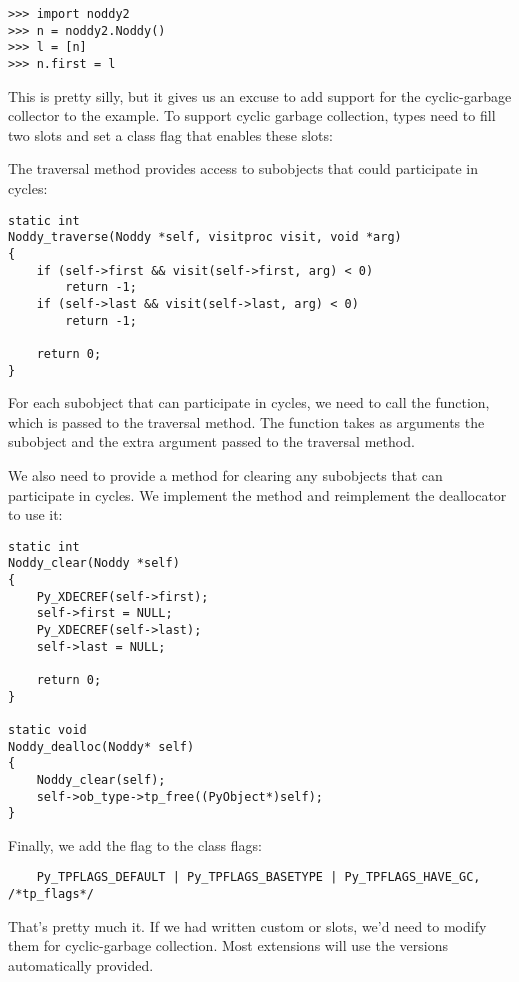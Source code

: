 \begin{verbatim}
>>> import noddy2
>>> n = noddy2.Noddy()
>>> l = [n]
>>> n.first = l
\end{verbatim}

This is pretty silly, but it gives us an excuse to add support for the
cyclic-garbage collector to the  example.  To support
cyclic garbage collection, types need to fill two slots and set a
class flag that enables these slots:



The traversal method provides access to subobjects that
could participate in cycles:

\begin{verbatim}
static int
Noddy_traverse(Noddy *self, visitproc visit, void *arg)
{
    if (self->first && visit(self->first, arg) < 0)
        return -1;
    if (self->last && visit(self->last, arg) < 0)
        return -1;

    return 0;
}
\end{verbatim}

For each subobject that can participate in cycles, we need to call the
 function, which is passed to the traversal method.
The  function takes as arguments the subobject and
the extra argument  passed to the traversal method.

We also need to provide a method for clearing any subobjects that can
participate in cycles.  We implement the method and reimplement the
deallocator to use it:

\begin{verbatim}
static int 
Noddy_clear(Noddy *self)
{
    Py_XDECREF(self->first);
    self->first = NULL;
    Py_XDECREF(self->last);
    self->last = NULL;

    return 0;
}

static void
Noddy_dealloc(Noddy* self)
{
    Noddy_clear(self);
    self->ob_type->tp_free((PyObject*)self);
}
\end{verbatim}

Finally, we add the  flag to the class
flags:

\begin{verbatim}
    Py_TPFLAGS_DEFAULT | Py_TPFLAGS_BASETYPE | Py_TPFLAGS_HAVE_GC, /*tp_flags*/
\end{verbatim}

That's pretty much it.  If we had written custom  or
 slots, we'd need to modify them for cyclic-garbage
collection. Most extensions will use the versions automatically
provided.

